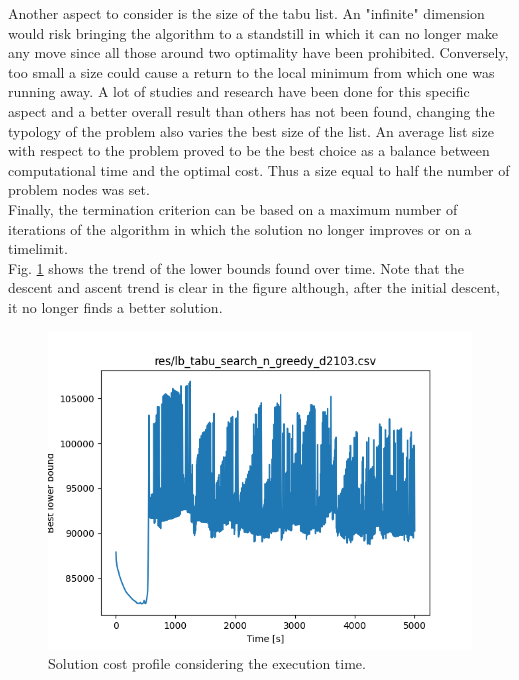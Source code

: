 Another aspect to consider is the size of the tabu list. An "infinite" dimension would risk bringing the algorithm to a standstill in which it can no longer make any move since all those around two optimality have been prohibited. Conversely, too small a size could cause a return to the local minimum from which one was running away. A lot of studies and research have been done for this specific aspect \cite{Nababan_2019, Tsubakitani1998} and a better overall result than others has not been found, changing the typology of the problem also varies the best size of the list. An average list size with respect to the problem proved to be the best choice as a balance between computational time and the optimal cost. Thus a size equal to half the number of problem nodes was set.\\
Finally, the termination criterion can be based on a maximum number of iterations of the algorithm in which the solution no longer improves or on a timelimit.\\
Fig. \ref{fig:tabu_search_perform_time} shows the trend of the lower bounds found over time. Note that the descent and ascent trend is clear in the figure although, after the initial descent, it no longer finds a better solution.
\begin{figure}[h]
	\centering
	\includegraphics[width=.70\columnwidth]{../res/lb_tabu_search_n_greedy_d2103.png}
	\caption{Solution cost profile considering the execution time.}
	\label{fig:tabu_search_perform_time}
\end{figure}

